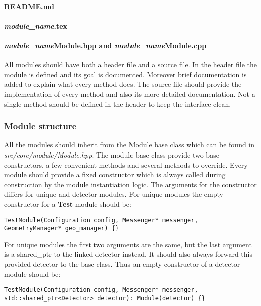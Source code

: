 \paragraph{README.md}
\todo

\paragraph{\textit{module\_name}.tex}
\todo

\paragraph{\textit{module\_name}Module.hpp and \textit{module\_name}Module.cpp}
All modules should have both a header file and a source file. In the header file the module is defined and its goal is documented. Moreover brief documentation is added to explain what every method does. The source file should provide the implementation of every method and also its more detailed documentation. Not a single method should be defined in the header to keep the interface clean.

\subsubsection{Module structure}
\label{sec:module_structure}
All the modules should inherit from the Module base class which can be found in \textit{src/core/module/Module.hpp}. The module base class provide two base constructors, a few convenient methods and several methods to override. Every module should provide a fixed constructor which is always called during construction by the module instantiation logic. The arguments for the constructor differs for unique and detector modules. For unique modules the empty constructor for a \textbf{Test} module should be:
\begin{verbatim}
TestModule(Configuration config, Messenger* messenger, GeometryManager* geo_manager) {}
\end{verbatim}

For unique modules the first two arguments are the same, but the last argument is a shared\_ptr to the linked detector instead. It should also always forward this provided detector to the base class. Thus an empty constructor of a detector module should be:
\begin{verbatim}
TestModule(Configuration config, Messenger* messenger, std::shared_ptr<Detector> detector): Module(detector) {}
\end{verbatim}

